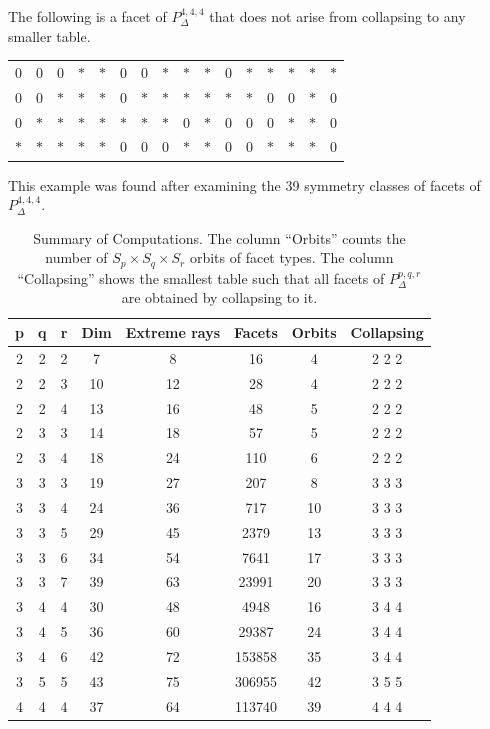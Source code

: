 \documentclass{elsart}
\newcommand{\as}{{$\ast$}}
\begin{document}
\begin{exmp}
The following is a facet of $P_\Delta^{4,4,4}$
that does not arise from collapsing to any smaller table.
\begin{center}
\begin{tabular}{cccc|cccc|cccc|cccc}
0&0&0&\as       &     \as&0&0&\as   &  \as&\as&0&\as   & \as&\as&\as&\as\\
0&0&\as&\as     &     \as&0&\as&\as &  \as&\as&\as&\as & 0&0&\as&0\\
0&\as&\as&\as   &    \as&\as&\as&\as&  0&\as&0&0       & 0&\as&\as&0\\
\as&\as&\as&\as &     \as&0&0&0     &  \as&\as&0&0 & \as&\as&\as&0\\
\end{tabular}
\end{center}
This example was found after examining the 39 symmetry classes of
facets of $P_\Delta^{4,4,4}$. 
\end{exmp}
\vspace{11pt}
\begin{table}
\caption{Summary of Computations.  The column ``Orbits'' counts the number
of $S_p \times S_q \times S_r$ orbits of facet types.
The column ``Collapsing'' shows the smallest table such that all facets of
$P_\Delta^{p,q,r}$ are obtained by collapsing to it. }\label{tab:comp}
\centering
\begin{tabular}{|ccc|ccccc|}
\hline
p & q & r & Dim & Extreme rays  & Facets    & Orbits & Collapsing\\
\hline
2 & 2 & 2 & 7  & 8  & 16 & 4 & 2 2 2\\
2 & 2 & 3 & 10  & 12 & 28 & 4 & 2 2 2\\
2 & 2 & 4 & 13 & 16 & 48 & 5 & 2 2 2\\
2 & 3 & 3 & 14 & 18 & 57 & 5 & 2 2 2\\
2 & 3 & 4 & 18 & 24 & 110& 6 & 2 2 2 \\
\hline
3 & 3 & 3 & 19 & 27 & 207 & 8 & 3 3 3\\
3 & 3 & 4 & 24 & 36 & 717 & 10 &3 3 3\\
3 & 3 & 5 & 29 & 45 & 2379 & 13 &3 3 3\\
3 & 3 & 6 & 34 & 54 & 7641 & 17 &3 3 3\\
3 & 3 & 7 & 39 & 63 & 23991 & 20 &3 3 3\\
\hline
3 & 4 & 4 & 30 & 48 & 4948 & 16 &3 4 4 \\
3 & 4 & 5 & 36 & 60 & 29387 & 24 & 3 4 4\\
3 & 4 & 6 & 42 & 72 & 153858 & 35 & 3 4 4\\
\hline
3 & 5 & 5 & 43 & 75 & 306955 & 42 & 3 5 5\\
\hline
4 & 4 & 4 & 37 & 64 & 113740 & 39 & 4 4 4\\
\hline
\end{tabular}
\end{table}
\end{document}
